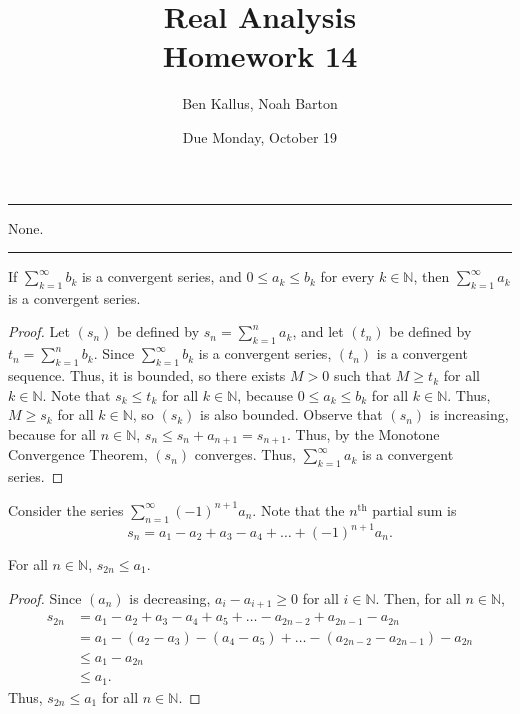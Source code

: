 \documentclass[12pt]{article}
\title{Real Analysis \\ Homework 14}
\author{Ben Kallus, Noah Barton}
\date{Due Monday, October 19}
\begin{document}
\maketitle

\hrule
\bigskip

 None.

\bigskip
\hrule
\bigskip

 If $\sum\limits_{k=1}^\infty b_k$ is a convergent series, and $0 \leq a_k \leq b_k$ for every $k \in \mathbb N$, then $\sum\limits_{k=1}^\infty a_k$ is a convergent series.
\begin{proof}
    Let $(s_n)$ be defined by $s_n = \sum\limits_{k=1}^n a_k$, and let $(t_n)$ be defined by $t_n = \sum\limits_{k=1}^n b_k$. Since $\sum\limits_{k=1}^\infty b_k$ is a convergent series, $(t_n)$ is a convergent sequence. Thus, it is bounded, so there exists $M > 0$ such that $M \geq t_k$ for all $k \in \mathbb N$. Note that $s_k \leq t_k$ for all $k \in \mathbb N$, because $0 \leq a_k \leq b_k$ for all $k \in \mathbb N$. Thus, $M \geq s_k$ for all $k \in \mathbb N$, so $(s_k)$ is also bounded. Observe that $(s_n)$ is increasing, because for all $n \in \mathbb N$, $s_n \leq s_n + a_{n+1} = s_{n+1}$. Thus, by the Monotone Convergence Theorem, $(s_n)$ converges. Thus, $\sum\limits_{k=1}^\infty a_k$ is a convergent series.
\end{proof}

\newpage
{} Consider the series $\sum\limits_{n=1}^\infty(-1)^{n+1}a_n$. Note that the $n^\text{th}$ partial sum is $$s_n=a_1 - a_2 + a_3 - a_4 + \hdots + (-1)^{n+1}a_n.$$

 For all $n \in \mathbb N$, $s_{2n} \leq a_1$.
\begin{proof}
    Since $(a_n)$ is decreasing, $a_i - a_{i+1} \geq 0$ for all $i \in \mathbb N$. Then, for all $n \in \mathbb N$,
    \begin{align*}
        s_{2n} &= a_1 - a_2 + a_3 - a_4 + a_5 + \hdots - a_{2n-2} + a_{2n-1} - a_{2n} \\
               &= a_1 - (a_2 - a_3) - (a_4 - a_5) + \hdots - (a_{2n-2} - a_{2n-1}) - a_{2n} \\
               &\leq a_1 - a_{2n} \\
               &\leq a_1.
    \end{align*}
    Thus, $s_{2n} \leq a_1$ for all $n \in \mathbb N$.
\end{proof}
\end{document}
